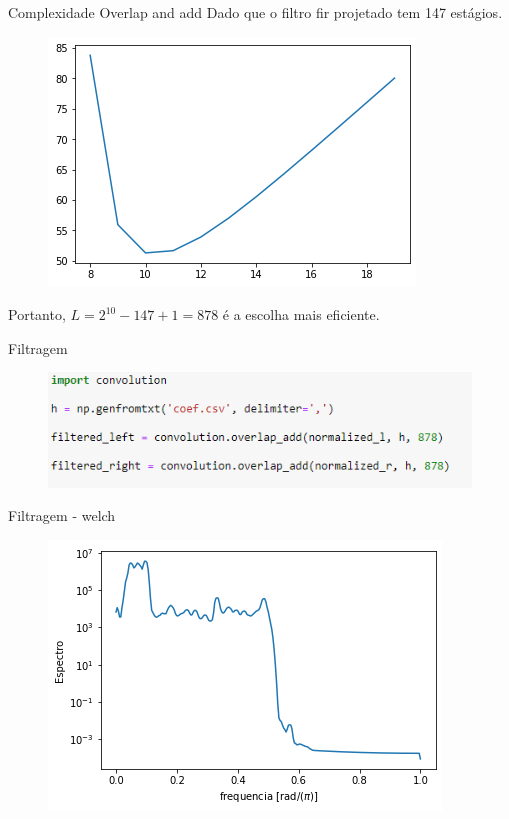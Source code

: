 \documentclass{beamer}
\begin{document}
\begin{frame}{Complexidade Overlap and add}
Dado que o filtro fir projetado tem 147 estágios.
\begin{figure}
    \centering
    \includegraphics[scale = 0.6]{complexidade.png}
\end{figure}
Portanto, $L = 2^{10} - 147 + 1 = 878$ é a escolha mais eficiente.  
\end{frame}

\begin{frame}{Filtragem}
    \begin{figure}
        \centering
        \includegraphics[scale = 1]{finalmente.png}
    \end{figure}
\end{frame}

\begin{frame}{Filtragem - welch}
    \begin{figure}
        \centering
        \includegraphics[scale = .8]{filtered_welsh.png}
    \end{figure}
\end{frame}
\end{document}
